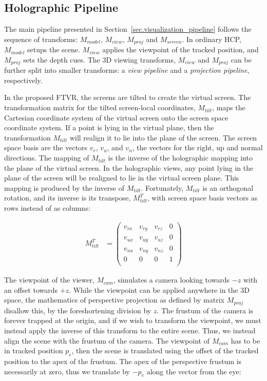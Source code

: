 \subsection{Holographic Pipeline}
\label{sec.holographic_pipeline}

The main pipeline presented in Section~\ref{sec.visualization_pipeline} follows the sequence of transforms: $M_{model}$, $M_{view}$, $M_{proj}$ and $M_{screen}$. In ordinary HCP, $M_{model}$ setups the scene. $M_{view}$ applies the viewpoint of the tracked position, and $M_{proj}$ sets the depth cues. The 3D viewing transforms, $M_{view}$ and $M_{proj}$ can be further split into smaller transforms: a \emph{view pipeline} and  a \emph{projection pipeline}, respectively.

In the proposed FTVR, the screens are tilted to create the virtual screen. The transformation matrix for the tilted screen-local coordinates, $M_{tilt}$, maps the Cartesian coordinate system of the virtual screen onto the screen space coordinate system. If a point is lying in the virtual plane, then the transformation $M_{tilt}$ will realign it to lie into the plane of the screen. The screen space basis are the vectors $v_r$, $v_u$, and $v_n$, the vectors for the right, up and normal directions. The mapping of $M_{tilt}$ is the inverse of the holographic mapping into the plane of the virtual screen. In the holographic views, any point lying in the plane of the screen will be realigned to lie in the virtual screen plane. This mapping is produced by the inverse of $M_{tilt}$. Fortunately, $M_{tilt}$ is an orthogonal rotation, and its inverse is its transpose, $M_{tilt}^{T}$, with screen space basis vectors as rows instead of as columns:

\begin{equation}
\begin{aligned}
M_{tilt}^{T} &= 
\begin{pmatrix} 
v_{rx} & v_{ry} & v_{rz} & 0\\
v_{ux} & v_{uy} & v_{uz} & 0\\
v_{nx} & v_{ny} & v_{nz} & 0\\
0      & 0      & 0      & 1\\
\end{pmatrix}
\end{aligned}
\label{eq.tilt_matrix_transpose}
\end{equation}

The viewpoint of the viewer, $M_{cam}$, simulates a camera looking towards $-z$ with an offset towards $+z$. While the viewpoint can be applied anywhere in the 3D space, the mathematics of perspective projection as defined by matrix $M_{proj}$ disallow this, by the foreshortening division by $z$. The frustum of the camera is forever trapped at the origin, and if we wish to transform the viewpoint, we must instead apply the inverse of this transform to the entire scene. Thus, we instead align the scene with the frustum of the camera. The viewpoint of $M_{cam}$ has to be in tracked position $p_e$, then the scene is translated using the offset of the tracked position to the apex of the frustum. The apex of the perspective frustum is necessarily at zero, thus we translate by $-p_e$ along the vector from the eye:


